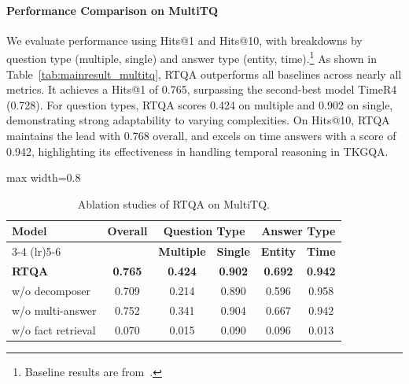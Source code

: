 \documentclass[11pt]{article}
\begin{document}
\paragraph{Performance Comparison on MultiTQ}  
We evaluate performance using Hits@1 and Hits@10, with breakdowns by question type (multiple, single) and answer type (entity, time).\footnote{\footnotesize Baseline results are from~\cite{qian2024timer4}.}  
As shown in Table~\ref{tab:mainresult_multitq}, RTQA outperforms all baselines across nearly all metrics. It achieves a Hits@1 of 0.765, surpassing the second-best model TimeR4 (0.728). For question types, RTQA scores 0.424 on multiple and 0.902 on single, demonstrating strong adaptability to varying complexities. On Hits@10, RTQA maintains the lead with 0.768 overall, and excels on time answers with a score of 0.942, highlighting its effectiveness in handling temporal reasoning in TKGQA.
\begin{table}[t]
\caption{Ablation studies of RTQA on MultiTQ.}
\label{tab:ablation result}
\vspace{-0.5em}
\centering
\footnotesize
\setlength{\tabcolsep}{2pt}
\begin{adjustbox}{max width=0.8\textwidth} %
\begin{tabular}{lccccc}
\toprule
\multirow{2}{1cm}{\textbf{Model}} & \multirow{2}{*}{\textbf{Overall}} & \multicolumn{2}{c}{\textbf{Question Type}} & \multicolumn{2}{c}{\textbf{Answer Type}} \\
\cmidrule(lr){3-4} \cmidrule(lr){5-6}
& & \textbf{Multiple} & \textbf{Single} & \textbf{Entity} & \textbf{Time} \\
\midrule
\textbf{RTQA} & \textbf{0.765} & \textbf{0.424} & \textbf{0.902} & \textbf{0.692} & \textbf{0.942} \\
w/o decomposer & 0.709 & 0.214 & 0.890 & 0.596 & 0.958 \\
w/o multi-answer  & 0.752 & 0.341 & 0.904 & 0.667 & 0.942 \\
w/o fact retrieval & 0.070 & 0.015 & 0.090 & 0.096 & 0.013 \\
\bottomrule
\end{tabular}
\end{adjustbox}

\vspace{-0.5em}
\end{table}
\end{document}
